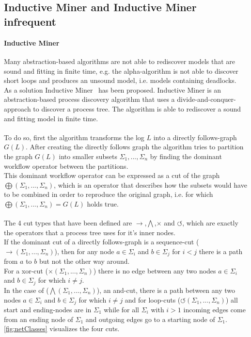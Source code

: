 \documentclass[
	a4paper,
	pagesize,
	pdftex,
	12pt,
	twoside, %
	BCOR=5mm, %
	ngerman,
	fleqn,
	final,
	]{scrartcl}
\begin{document}
\subsection{Inductive Miner and Inductive Miner infrequent}
\paragraph*{Inductive Miner}
Many abstraction-based algorithms are not able to rediscover models that are sound and fitting in finite time, e.g. the alpha-algorithm is not able to discover short loops and produces an unsound model, i.e. models containing deadlocks.\\ 
As a solution Inductive Miner~\cite{InductiveMiner} has been proposed. Inductive Miner is an abstraction-based process discovery algorithm that uses a divide-and-conquer-approach to discover a process tree. The algorithm is able to rediscover a sound and fitting model in finite time.\\\\
To do so, first the algorithm transforms the log $L$ into a directly follows-graph $G(L)$. After creating the directly follows graph the algorithm tries to partition the graph $G(L)$ into smaller subsets $\Sigma_1,...,\Sigma_n$ by finding the dominant workflow operator between the partitions.\\
This dominant workflow operator can be expressed as a cut of the graph $\bigoplus(\Sigma_1,...,\Sigma_n)$, which is an operator that describes how the subsets would have to be combined in order to reproduce the original graph, i.e. for which $\bigoplus(\Sigma_1,...,\Sigma_n)=G(L)$ holds true. \\\\The 4 cut types that have been defined are $\rightarrow$,$\bigwedge$,$\times$ and $\circlearrowleft$, which are exactly the operators that a process tree uses for it's inner nodes.\\
If the dominant cut of a directly follows-graph is a sequence-cut ($\rightarrow(\Sigma_1,...,\Sigma_n)$), then for any node $a\in\Sigma_i$ and $b\in\Sigma_j$ for $i<j$ there is a path from $a$ to $b$ but not the other way around.\\ For a xor-cut ($\times(\Sigma_1,...,\Sigma_n)$) there is no edge between any two nodes $a\in\Sigma_i$ and $b\in\Sigma_j$ for which $i\neq j$. \\
In the case of ($\bigwedge(\Sigma_1,...,\Sigma_n)$), an and-cut, there is a path between any two nodes $a\in\Sigma_i$ and $b\in\Sigma_j$ for which $i\neq j$ and for loop-cuts ($\circlearrowleft(\Sigma_1,...,\Sigma_n)$) all start and ending-nodes are in $\Sigma_1$ while for all $\Sigma_i$ with $i>1$ incoming edges come from an ending node of $\Sigma_1$ and outgoing edges go to a starting node of $\Sigma_1$. \ref{fig:netClasses} visualizes the four cuts.\\
\end{document}
